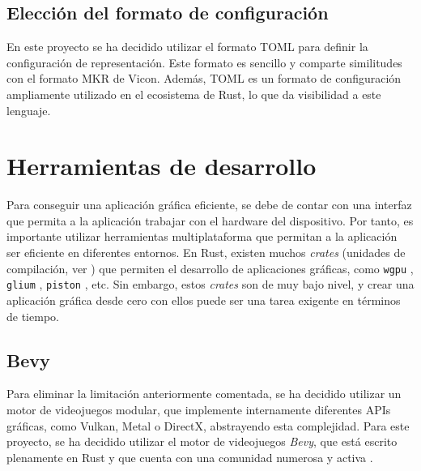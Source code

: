 \subsection{Elección del formato de configuración}

En este proyecto se ha decidido utilizar el formato \ac{TOML} para definir la configuración de representación. Este formato es sencillo y comparte similitudes con el formato MKR de Vicon. Además, \ac{TOML} es un formato de configuración ampliamente utilizado en el ecosistema de Rust, lo que da visibilidad a este lenguaje.

\section{Herramientas de desarrollo}

Para conseguir una aplicación gráfica eficiente, se debe de contar con una interfaz que permita a la aplicación trabajar con el hardware del dispositivo. Por tanto, es importante utilizar herramientas multiplataforma que permitan a la aplicación ser eficiente en diferentes entornos. En Rust, existen muchos \textit{crates} (unidades de compilación, ver \autocite{PackagesCratesRust}) que permiten el desarrollo de aplicaciones gráficas, como \texttt{wgpu} \autocite{WgpuPortableGraphics}, \texttt{glium} \autocite{GliumGlium2025}, \texttt{piston} \autocite{PistonModularOpen}, etc. Sin embargo, estos \textit{crates} son de muy bajo nivel, y crear una aplicación gráfica desde cero con ellos puede ser una tarea exigente en términos de tiempo. 

\subsection{Bevy} \label{subsec:bevy}
Para eliminar la limitación anteriormente comentada, se ha decidido utilizar un motor de videojuegos modular, que implemente internamente diferentes APIs gráficas, como Vulkan, Metal o DirectX, abstrayendo esta complejidad. Para este proyecto, se ha decidido utilizar el motor de videojuegos \textit{Bevy}, que está escrito plenamente en Rust y que cuenta con una comunidad numerosa y activa \autocite{BevyEngine}.

